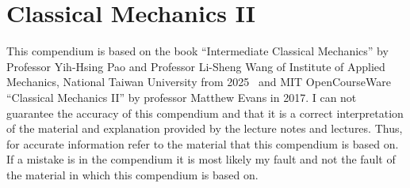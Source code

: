 \chapter{Classical Mechanics II}
This compendium is based on the book ``Intermediate Classical Mechanics'' by Professor Yih-Hsing Pao and Professor Li-Sheng Wang of Institute of Applied Mechanics, National Taiwan University from 2025~\cite{Pao2025Intermediate} and MIT OpenCourseWare ``Classical Mechanics II'' by professor Matthew Evans in 2017.
I can not guarantee the accuracy of this compendium and that it is a correct interpretation of the material and explanation provided by the lecture notes and lectures. Thus, for accurate information refer to the material that this compendium is based on. If a mistake is in the compendium it is most likely my fault and not the fault of the material in which this compendium is based on.
